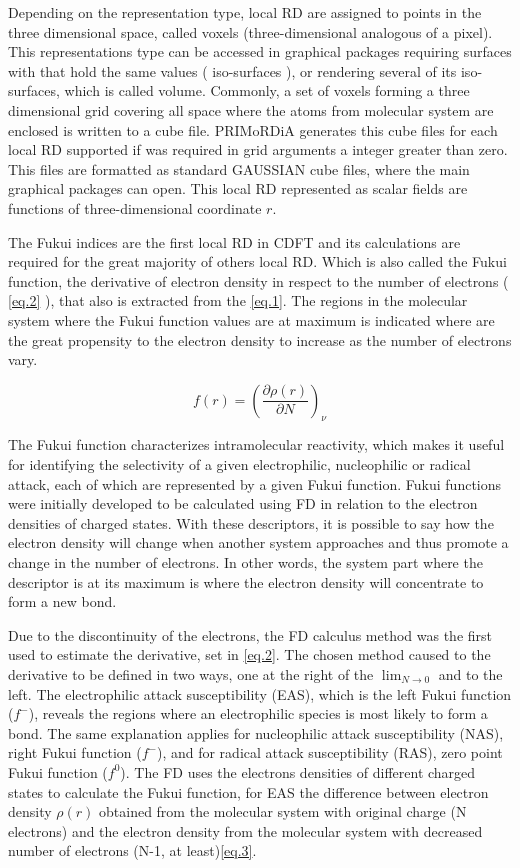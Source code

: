 \documentclass[a4paper,11pt]{refart}
\begin{document}
Depending on the representation type, local RD are assigned to  points in the three dimensional space, called voxels (three-dimensional analogous of a pixel). This representations type can be accessed in graphical packages requiring surfaces with that hold the same values ( iso-surfaces ), or rendering several of its iso-surfaces, which is called volume. Commonly, a set of voxels forming a three dimensional grid covering all space where the atoms from molecular system are enclosed is written to a cube file. PRIMoRDiA generates this cube files for each local RD supported if was required in grid arguments a integer greater than zero. This files are formatted as standard GAUSSIAN cube files, where the main graphical packages can open. This local RD represented as scalar fields are functions of three-dimensional coordinate $r$. 

The Fukui indices are the first local RD in CDFT and its calculations are required for the great majority of others local RD. Which is also called the Fukui function, the derivative of electron density in respect to the number of electrons ( \autoref{eq.2} ), that also is extracted from the \autoref{eq.1}\cite{Parr1984}. The regions in the molecular system where the Fukui function values are at maximum is indicated where are the great propensity to the electron density to increase as the number of electrons vary.
   
\begin{equation}
f(r) = \left(\frac{\partial \rho(r)}{\partial N} \right)_\nu
\label{eq.2}
\end{equation}

The Fukui function characterizes intramolecular reactivity, which makes it useful for identifying the selectivity of a given electrophilic, nucleophilic or radical attack, each of which are represented by a given Fukui function. Fukui functions were initially developed to be calculated using FD in relation to the electron densities of charged states. With these descriptors, it is possible to say how the electron density will change when another system approaches and thus promote a change in the number of electrons. In other words, the system part where the descriptor is at its maximum is where the electron density will concentrate to form a new bond.

Due to the discontinuity of the electrons, the FD calculus method was the first used to estimate the derivative, set in \autoref{eq.2}. The chosen method caused to the derivative to be defined in two ways, one at the right of the $ \lim_{N \to 0}$ and to the left.  The electrophilic attack susceptibility (EAS), which is the left Fukui function ($f^{-}$), reveals the regions where an electrophilic species is most likely to form a bond. The same explanation applies for nucleophilic attack susceptibility (NAS), right Fukui function ($f^{-}$), and for radical attack susceptibility (RAS), zero point Fukui function ($f^{0}$). The FD uses the electrons densities of different charged states to calculate the Fukui function, for EAS the difference between electron density $\rho(r)$ obtained from the molecular system with original charge (N electrons) and the electron density from the molecular system with decreased number of electrons (N-1, at least)\autoref{eq.3}. 
\end{document}
